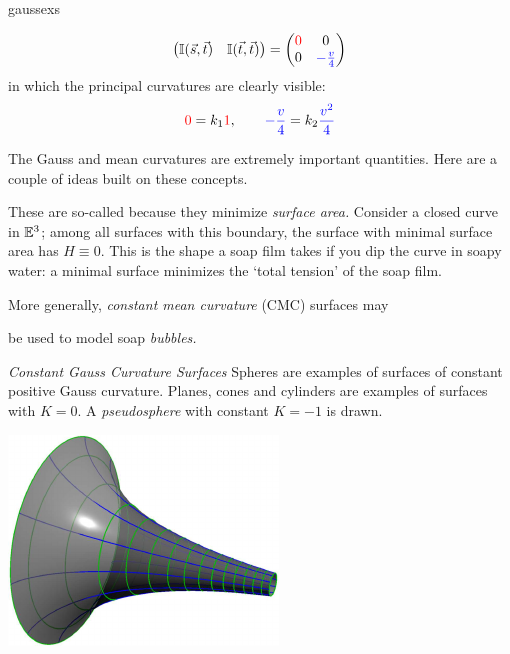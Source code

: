 \begin{examples}{}{gaussexs}
\begin{enumerate}
\begin{align*}
\begin{pmatrix}
  	\mathbb{I}(\vec s,\vec t)&\mathbb{I}(\vec t,\vec t)
	\end{pmatrix}
	=
	\begin{pmatrix}
  \textcolor{red}{0}&0\\
  0&\textcolor{blue}{-\frac{v}4}
  \end{pmatrix}
  \end{align*}
  in which the principal curvatures are clearly visible:
  \[\textcolor{red}{0}=k_1\textcolor{red}{1},\qquad \textcolor{blue}{-\frac{v}4}=k_2\textcolor{blue}{\frac{v^2}4}\]
\end{enumerate}
\end{examples}

\goodbreak

The Gauss and mean curvatures are extremely important quantities. Here are a couple of ideas built on these concepts.

\begin{description}
	\item[\normalfont\emph{Minimal Surfaces} $H\equiv 0$] These are so-called because they minimize \emph{surface area.} Consider a closed curve in $\mathbb{E}^3$; among all surfaces with this boundary, the surface with minimal surface area has $H\equiv 0$. This is the shape a soap film takes if you dip the curve in soapy water: a minimal surface minimizes the `total tension' of the soap film.
	
\begin{minipage}[t]{0.65\linewidth}\vspace{-8pt}
	\hangindent\leftmargini More generally, \emph{constant mean curvature} (CMC) surfaces may\par be used to model soap \emph{bubbles.}
	\item[\normalfont\emph{Constant Gauss Curvature Surfaces}] Spheres are examples of surfaces of constant positive Gauss curvature. Planes, cones and cylinders are examples of surfaces with $K=0$. A \emph{pseudosphere} with constant $K=-1$ is drawn.
\end{minipage}\hfill\begin{minipage}[t]{0.34\linewidth}\vspace{-12pt}
	\flushright\href{http://www.math.uci.edu/~ndonalds/math162a/curv-pseudosphere.html}{\includegraphics{curv-pseudosphere}}\vspace{-5pt}
\end{minipage}
\end{description}

